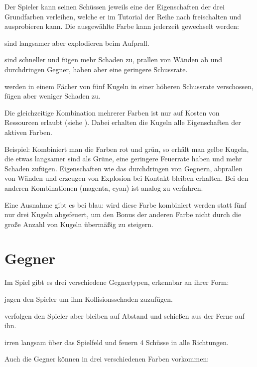 Der Spieler kann seinen Schüssen jeweils eine der Eigenschaften der drei Grundfarben verleihen, welche er im Tutorial der Reihe nach freischalten und ausprobieren kann. Die ausgewählte Farbe kann jederzeit gewechselt werden:

\renewcommand{\itmspace}{4.5em}
{sind langsamer aber explodieren beim Aufprall.}

{sind schneller und fügen mehr Schaden zu, prallen von Wänden ab und durchdringen Gegner, haben aber eine geringere Schussrate.}

{werden in einem Fächer von fünf Kugeln in einer höheren Schussrate verschossen, fügen aber weniger Schaden zu.}

Die gleichzeitige Kombination mehrerer Farben ist nur auf Kosten von Ressourcen erlaubt (siehe ). Dabei erhalten die Kugeln alle Eigenschaften der aktiven Farben.

Beispiel: Kombiniert man die Farben rot und grün, so erhält man gelbe Kugeln, die etwas langsamer sind als Grüne, eine geringere Feuerrate haben und mehr Schaden zufügen. Eigenschaften wie das durchdringen von Gegnern, abprallen von Wänden und erzeugen von Explosion bei Kontakt bleiben erhalten. Bei den anderen Kombinationen (magenta, cyan) ist analog zu verfahren.

Eine Ausnahme gibt es bei blau: wird diese Farbe kombiniert werden statt fünf nur drei Kugeln abgefeuert, um den Bonus der anderen Farbe nicht durch die gro{\ss}e Anzahl von Kugeln übermä{\ss}ig zu steigern.


\section{Gegner}

Im Spiel gibt es drei verschiedene Gegnertypen, erkennbar an ihrer Form:

\renewcommand{\itmspace}{4.5em}
{jagen den Spieler um ihm Kollisionsschaden zuzufügen.}

{verfolgen den Spieler aber bleiben auf Abstand und schie{\ss}en aus der Ferne auf ihn.}

{irren langsam über das Spielfeld und feuern 4 Schüsse in alle Richtungen.}

Auch die Gegner können in drei verschiedenen Farben vorkommen:

